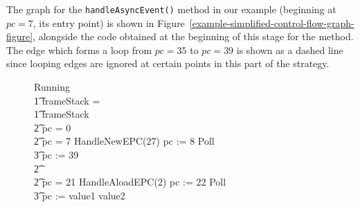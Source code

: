 The graph for the \texttt{handleAsyncEvent()} method in our example
(beginning at $pc=7$, its entry point) is shown in
Figure~\ref{example-simplified-control-flow-graph-figure}, alongside
the \Circus{} code obtained at the beginning of this stage for the
method.
The edge which forms a loop from $pc=35$ to $pc=39$ is shown as a
dashed line since looping edges are ignored at certain points in this
part of the strategy.
\begin{figure}
  \begin{center}
    \begin{minipage}{0.3\linewidth}
    \end{minipage}
    \begin{minipage}{0.6\linewidth}
      \scriptsize
      \setlength{\zedindent}{0cm}
      \begin{circus}
        Running \circdef \\
        \t1 \circif frameStack = \emptyset \circthen \Skip \\
        \t1 {} \circelse frameStack \neq \emptyset \circthen {} \\
        \t2 \circif pc = 0 \circthen {} \cdots {} \\
        \t2 {} \circelse pc = 7 \circthen HandleNewEPC(27) \circseq pc := 8 \circseq Poll \circseq \cdots \circseq \\
        \t3 pc := 39 \\
        \t2 {} \cdots {} \\
        \t2 {} \circelse pc = 21 \circthen HandleAloadEPC(2) \circseq pc := 22 \circseq Poll \circseq \cdots \circseq \\
        \t3 pc := \IF value1 \leq value2   \\

\end{circus}
\end{minipage}
\end{center}
\end{figure}
